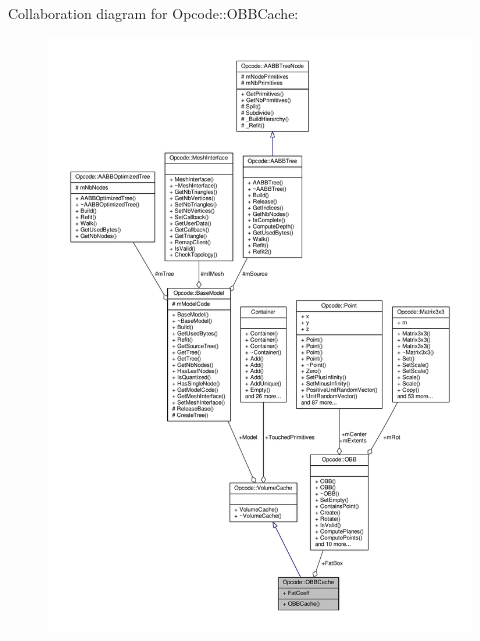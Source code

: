 Collaboration diagram for Opcode\+:\+:O\+B\+B\+Cache\+:
\nopagebreak
\begin{figure}[H]
\begin{center}
\leavevmode
\includegraphics[width=350pt]{d7/d3c/structOpcode_1_1OBBCache__coll__graph}
\end{center}
\end{figure}
